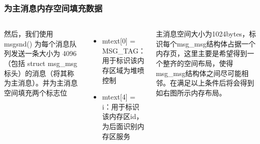 \documentclass[xcolor=table]{beamer}
\begin{document}
\begin{frame}[fragile]
\frametitle{为主消息内存空间填充数据}

\begin{columns}[c]

\small{然后，我们使用 msgsnd() 为每个消息队列发送一条大小为 4096（包括 struct msg\_msg 标头）的消息（将其称为主消息）。并为主消息空间填充两个标志位}

\footnotesize\begin{itemize}
	\item mtext[0] = MSG\_TAG：用于标识该内存区域为堆喷控制
	\item mtext[4] = i：用于标识该内存区id，为后面识别内存区服务
\end{itemize}

\small{主消息空间大小为1024bytes，标识每个msg\_msg结构体占据一个内存页，这里主要是希望得到一个整齐的空间布局，使得msg\_msg结构体之间尽可能相邻。在满足以上条件后将会得到如右图所示内存布局。}


\end{columns}
\end{frame}
\end{document}
